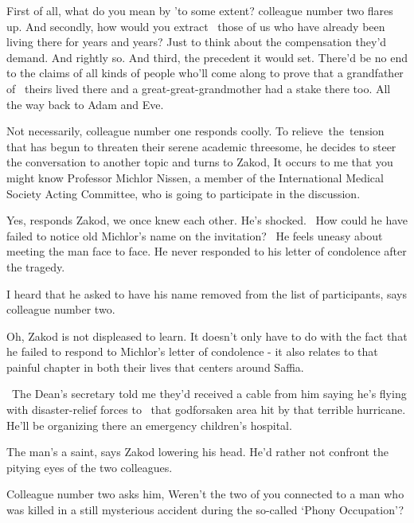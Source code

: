 \documentclass[letterpaper]{article}
\begin{document}
{\textquotedbl}First of all, what do you mean by 'to some extent?{\textquotedbl} colleague number two flares up.
{\textquotedbl}And secondly, how would you extract \ those of us who have already been living there for years and
years? Just to think about the compensation they'd demand. And rightly so. And third, the precedent it would set.
There'd be no end to the claims of all kinds of people who'll come along to prove that a grandfather of \ theirs lived
there and a great-great-grandmother had a stake there too. All the way back to Adam and Eve.{\textquotedbl} 

{\textquotedbl}Not necessarily,{\textquotedbl} colleague number one responds coolly. To relieve~the~tension that has
begun to threaten their serene academic threesome, he decides to steer the conversation to another topic and turns to
Zakod, {\textquotedbl}It occurs to me that you might know Professor Michlor Nissen, a member of the International
Medical Society Acting Committee, who is going to participate in the discussion.{\textquotedbl} 

{\textquotedbl}Yes,{\textquotedbl} responds Zakod, {\textquotedbl}we once knew each other.{\textquotedbl} He's shocked.
~How could he have failed to notice old Michlor's name on the invitation? ~He feels uneasy about meeting the man face
to face. He never responded to his letter of condolence after the tragedy. 

{\textquotedbl}I heard that he asked to have his name removed from the list of participants,{\textquotedbl} says
colleague number two. 

{\textquotedbl}Oh,{\textquotedbl} Zakod is not displeased to learn. It doesn't only have to do with the fact that he
failed to respond to Michlor's letter of condolence - it also relates to that painful chapter in both their lives that
centers around Saffia.

~{\textquotedbl}The Dean's secretary told me they'd received a cable from him saying he's flying with disaster-relief
forces to {\ }that godforsaken area hit by that terrible hurricane. He'll be organizing there an
emergency children's hospital.{\textquotedbl} 

{\textquotedbl}The man's a saint,{\textquotedbl} says Zakod lowering his head. He'd rather not confront the pitying eyes
of the two colleagues. 

Colleague number two asks him, {\textquotedbl}Weren't the two of you connected to a man who was killed in a still
mysterious accident during the so-called `Phony Occupation'?{\textquotedbl} 
\end{document}
